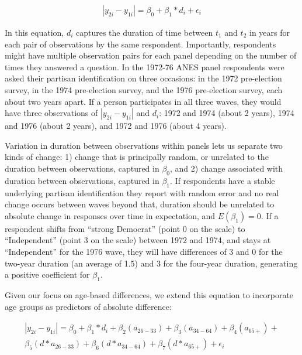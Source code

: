 \documentclass[
  12pt,
]{article}
\begin{document}
\begin{equation*}
 \begin{aligned}
   |y_{2i}-y_{1i} | = \beta_0 + \beta_1*d_i + \epsilon_i
 \end{aligned}
 \end{equation*}

In this equation, \(d_{i}\) captures the duration of time between \(t_1\) and \(t_2\) in years for each pair of observations by the same respondent. Importantly, respondents might have multiple observation pairs for each panel depending on the number of times they answered a question. In the 1972-76 ANES panel respondents were asked their partisan identification on three occasions: in the 1972 pre-election survey, in the 1974 pre-election survey, and the 1976 pre-election survey, each about two years apart. If a person participates in all three waves, they would have three observations of \(|y_{2i}-y_{1i} |\) and \(d_i\): 1972 and 1974 (about 2 years), 1974 and 1976 (about 2 years), and 1972 and 1976 (about 4 years).

Variation in duration between observations within panels lets us separate two kinds of change: 1) change that is principally random, or unrelated to the duration between observations, captured in \(\beta_0\), and 2) change associated with duration between observations, captured in \(\beta_1\). If respondents have a stable underlying partisan identification they report with random error and no real change occurs between waves beyond that, duration should be unrelated to absolute change in responses over time in expectation, and \(E(\beta_1) = 0\). If a respondent shifts from ``strong Democrat'' (point 0 on the scale) to ``Independent'' (point 3 on the scale) between 1972 and 1974, and stays at ``Independent'' for the 1976 wave, they will have differences of 3 and 0 for the two-year duration (an average of 1.5) and 3 for the four-year duration, generating a positive coefficient for \(\beta_1\).

Given our focus on age-based differences, we extend this equation to incorporate age groups as predictors of absolute difference:

\begin{equation*}
 \begin{aligned}
   |y_{2i}-y_{1i} | = \beta_0 + \beta_1*d_i + \beta_2(a_{26-33}) + \beta_3(a_{34-64}) + \beta_4(a_{65+}) + \\
   \beta_5(d*a_{26-33}) + \beta_6(d*a_{34-64}) + \beta_7(d*a_{65+}) + \epsilon_i
 \end{aligned}
 \end{equation*}
\end{document}
